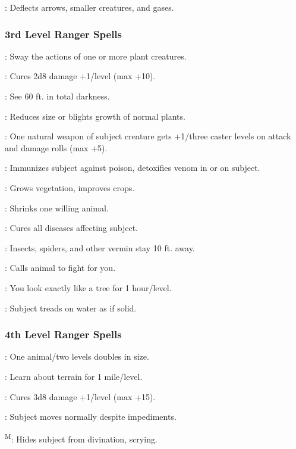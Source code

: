 : Deflects arrows, smaller creatures, and gases.

\subsubsection{3rd Level Ranger Spells}

: Sway the actions of one or more plant creatures.

: Cures 2d8 damage +1/level (max +10).

: See 60 ft. in total darkness.

: Reduces size or blights growth of normal plants.

: One natural weapon of subject creature gets +1/three caster levels on attack and damage rolls (max +5).

: Immunizes subject against poison, detoxifies venom in or on subject.

: Grows vegetation, improves crops.

: Shrinks one willing animal.

: Cures all diseases affecting subject.

: Insects, spiders, and other vermin stay 10 ft. away.

: Calls animal to fight for you.

: You look exactly like a tree for 1 hour/level.

: Subject treads on water as if solid.

\subsubsection{4th Level Ranger Spells}

: One animal/two levels doubles in size.

: Learn about terrain for 1 mile/level.

: Cures 3d8 damage +1/level (max +15).

: Subject moves normally despite impediments.

\textsuperscript{M}: Hides subject from divination, scrying.


